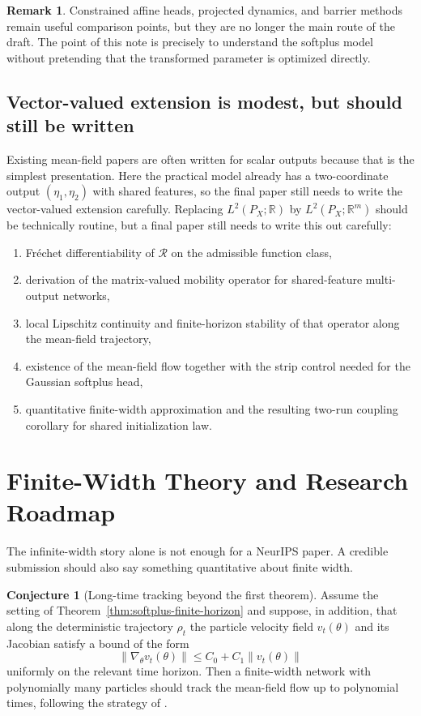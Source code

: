 \documentclass[11pt]{article}
\theoremstyle{definition}
\newtheorem{remark}[theorem]{Remark}
\newtheorem{conjecture}[theorem]{Conjecture}
\newcommand{\R}{\mathbb{R}}
\newcommand{\norm}[1]{\left\lVert #1 \right\rVert}
\newcommand{\mc}[1]{\mathcal{#1}}
\begin{document}
\begin{remark}
Constrained affine heads, projected dynamics, and barrier methods remain useful
comparison points, but they are no longer the main route of the draft. The
point of this note is precisely to understand the softplus model without
pretending that the transformed parameter is optimized directly.
\end{remark}

\subsection{Vector-valued extension is modest, but should still be written}

Existing mean-field papers are often written for scalar outputs because that is
the simplest presentation. Here the practical model already has a
two-coordinate output $(\eta_1,\eta_2)$ with shared features, so the final
paper still needs to write the vector-valued extension carefully. Replacing
$L^2(P_X;\R)$ by $L^2(P_X;\R^m)$ should be technically routine, but a final
paper still needs to write this out carefully:
\begin{enumerate}[label=(\arabic*)]
  \item Fr\'echet differentiability of $\mc{R}$ on the admissible function class,
  \item derivation of the matrix-valued mobility operator for shared-feature
  multi-output networks,
  \item local Lipschitz continuity and finite-horizon stability of that
  operator along the mean-field trajectory,
  \item existence of the mean-field flow together with the strip control needed
  for the Gaussian softplus head,
  \item quantitative finite-width approximation and the resulting two-run
  coupling corollary for shared initialization law.
\end{enumerate}

\section{Finite-Width Theory and Research Roadmap}

The infinite-width story alone is not enough for a NeurIPS paper. A credible
submission should also say something quantitative about finite width.

\begin{conjecture}[Long-time tracking beyond the first theorem]
\label{conj:finite-width}
Assume the setting of Theorem~\ref{thm:softplus-finite-horizon} and suppose, in
addition, that along the deterministic trajectory $\rho_t$ the particle
velocity field $v_t(\theta)$ and its Jacobian satisfy a bound of the form
\begin{equation}
  \norm{\nabla_\theta v_t(\theta)}
  \le
  C_0 + C_1 \norm{v_t(\theta)}
\end{equation}
uniformly on the relevant time horizon. Then a finite-width network with
polynomially many particles should track the mean-field flow up to polynomial
times, following the strategy of \cite{GlasgowWuBruna2025}.
\end{conjecture}
\end{document}

